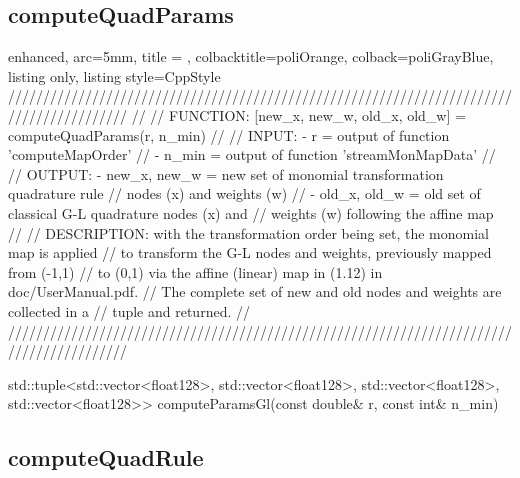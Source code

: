 \documentclass[a4paper, twosided]{book}
\begin{document}
\subsection[computeQuadParams]{\changefont computeQuadParams}\label{SubSec4.1.4}

\begin{tcblisting}{enhanced,
                   arc=5mm,
                   title = \color{black}{\large \ttfamily MonMap.cpp/computeQuadParams},
                   colbacktitle=poliOrange,
                   colback=poliGrayBlue,
                   listing only,
                   listing style=CppStyle}
/////////////////////////////////////////////////////////////////////////////////////////
//
//       FUNCTION: [{new_x, new_w, old_x, old_w}] = computeQuadParams(r, n_min)
//                
//          INPUT: - r = output of function 'computeMapOrder'
//                 - n_min = output of function 'streamMonMapData'
//
//         OUTPUT: - {new_x, new_w} = new set of monomial transformation quadrature rule
//                                    nodes (x) and weights (w)
//                 - {old_x, old_w} = old set of classical G-L quadrature nodes (x) and
//                                    weights (w) following the affine map
//
//    DESCRIPTION: with the transformation order being set, the monomial map is applied
//                 to transform the G-L nodes and weights, previously mapped from (-1,1)
//                 to (0,1) via the affine (linear) map in (1.12) in doc/UserManual.pdf.  
//                 The complete set of new and old nodes and weights are collected in a 
//                 tuple and returned.
//
/////////////////////////////////////////////////////////////////////////////////////////

std::tuple<std::vector<float128>, std::vector<float128>, std::vector<float128>, std::vector<float128>> computeParamsGl(const double& r, const int& n_min)
\end{tcblisting}

\newpage
\subsection[computeQuadRule]{\changefont computeQuadRule}\label{Sec4.1.5}
\end{document}

